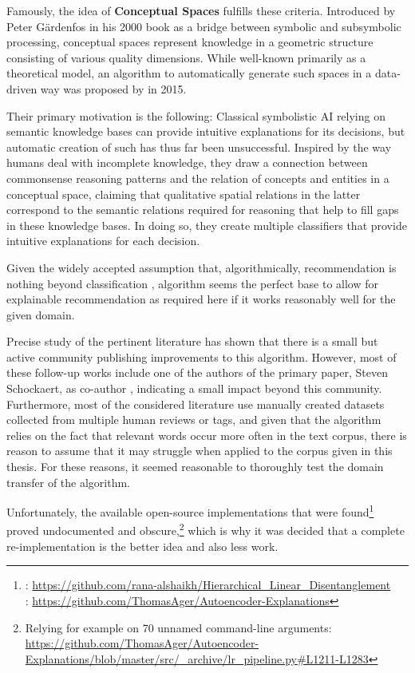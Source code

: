 Famously, the idea of \textbf{Conceptual Spaces} fulfills these criteria. Introduced by Peter Gärdenfos in his 2000 book  \cite{Gardenfors2000a} as a bridge between symbolic and subsymbolic processing, conceptual spaces represent knowledge in a geometric structure consisting of various quality dimensions. While well-known primarily as a theoretical model, an algorithm to automatically generate such spaces in a data-driven way was proposed by \textcite{Derrac2015} in 2015.

Their primary motivation is the following: Classical symbolistic AI relying on semantic knowledge bases can provide intuitive explanations for its decisions, but automatic creation of such has thus far been unsuccessful. Inspired by the way humans deal with incomplete knowledge, they draw a connection between commonsense reasoning patterns and the relation of concepts and entities in a conceptual space, claiming that qualitative spatial relations in the latter correspond to the semantic relations required for reasoning that help to fill gaps in these knowledge bases. In doing so, they create multiple classifiers that provide intuitive explanations for each decision. 

Given the widely accepted assumption that, algorithmically, recommendation is nothing beyond classification \cite{Linden2003,Ai2018,Sarwar2000},  algorithm seems the perfect base to allow for explainable recommendation as required here if it works reasonably well for the given domain.

Precise study of the pertinent literature has shown that there is a small but active community publishing improvements to this algorithm. However, most of these follow-up works include one of the authors of the primary paper, Steven Schockaert, as co-author \cite{Ager2018,Alshaikh2020}, indicating a small impact beyond this community. Furthermore, most of the considered literature use manually created datasets collected from multiple human reviews or tags, and given that the algorithm relies on the fact that relevant words occur more often in the text corpus, there is reason to assume that it may struggle when applied to the corpus given in this thesis. For these reasons, it seemed reasonable to thoroughly test the domain transfer of the algorithm.

Unfortunately, the available open-source implementations that were found\footnote{\cite{Alshaikh2020}: \url{https://github.com/rana-alshaikh/Hierarchical_Linear_Disentanglement}\\ \indent {} \cite{Ager2018}: \url{https://github.com/ThomasAger/Autoencoder-Explanations} } proved undocumented and obscure,\footnote{Relying for example on 70 unnamed command-line arguments: \url{https://github.com/ThomasAger/Autoencoder-Explanations/blob/master/src/_archive/lr_pipeline.py\#L1211-L1283} }
 which is why it was decided that a complete re-implementation is the better idea and also less work. 

